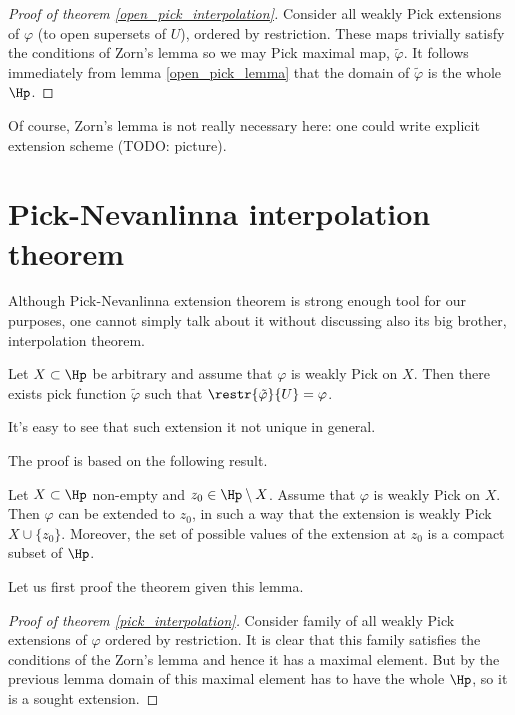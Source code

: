 \begin{proof}[Proof of theorem \ref{open_pick_interpolation}]
	Consider all weakly Pick extensions of $\varphi$ (to open supersets of $U$), ordered by restriction. These maps trivially satisfy the conditions of Zorn's lemma so we may Pick maximal map, $\tilde{\varphi}$. It follows immediately from lemma \ref{open_pick_lemma} that the domain of $\tilde{\varphi}$ is the whole $\Hp$.
\end{proof}

Of course, Zorn's lemma is not really necessary here: one could write explicit extension scheme (TODO: picture).

\section{Pick-Nevanlinna interpolation theorem}

Although Pick-Nevanlinna extension theorem is strong enough tool for our purposes, one cannot simply talk about it without discussing also its big brother, interpolation theorem.

\begin{lause}\label{pick_interpolation}
	Let $X \subset \Hp$ be arbitrary and assume that $\varphi$ is weakly Pick on $X$. Then there exists pick function $\tilde{\varphi}$ such that $\restr{\tilde{\varphi}}{U} = \varphi$.
\end{lause}

It's easy to see that such extension it not unique in general.

The proof is based on the following result.

\begin{lem}\label{pick_extension_lemma}
	Let $X \subset \Hp$ non-empty and $z_{0} \in \Hp \setminus X$. Assume that $\varphi$ is weakly Pick on $X$. Then $\varphi$ can be extended to $z_{0}$, in such a way that the extension is weakly Pick $X \cup \{z_{0}\}$. Moreover, the set of possible values of the extension at $z_{0}$ is a compact subset of $\Hp$.
\end{lem}

Let us first proof the theorem given this lemma.

\begin{proof}[Proof of theorem \ref{pick_interpolation}]
	Consider family of all weakly Pick extensions of $\varphi$ ordered by restriction. It is clear that this family satisfies the conditions of the Zorn's lemma and hence it has a maximal element. But by the previous lemma domain of this maximal element has to have the whole $\Hp$, so it is a sought extension.
\end{proof}

